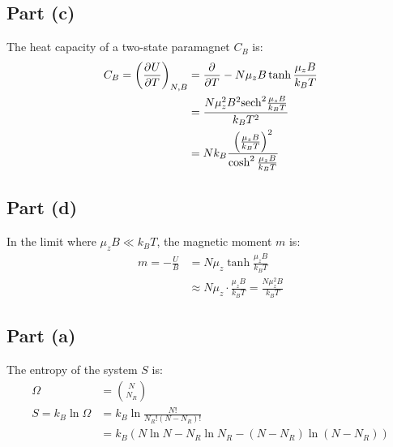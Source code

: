 \documentclass{article}
\begin{document}
\subsection*{Part (c)}
The heat capacity of a two-state paramagnet $C_B$ is:
\begin{equation}
    \begin{split}
        C_B = {\left(\frac{\partial^{}U} {\partial T^{}}\right)}_{N,B} & = \frac{\partial^{}} {\partial T^{}}-N\mu_z B\tanh\frac{\mu_z B}{k_B T} \\
        & = \frac{N{\mu}_z^2B^2\mathrm{sech}^2\frac{\mu_z B}{k_B T}}{k_B T^2} \\
        & = Nk_B\frac{{\left(\frac{\mu_z B}{k_B T}\right)}^2}{\cosh^2\frac{\mu_z B}{k_B T}}
    \end{split}
\end{equation}
\subsection*{Part (d)}
In the limit where $\mu_z B \ll k_B T$, the magnetic moment $m$ is:
\begin{equation}
    \begin{split}
        m = -\frac{U}{B} & = N\mu_z\tanh\frac{\mu_z B}{k_B T} \\
        & \approx N\mu_z \cdot \frac{\mu_z B}{k_B T} = \frac{N\mu_z^2B}{k_B T}
    \end{split}
\end{equation}
\begin{center}
\end{center}

\clearpage

\subsection*{Part (a)}
The entropy of the system $S$ is:
\begin{equation}
    \begin{split}
        \Omega & = {N \choose N_R} \\
        S = k_B\ln\Omega & = k_B\ln\frac{N!}{N_R!\left(N - N_R\right)!} \\
        & = k_B\left(N\ln N - N_R\ln N_R - \left(N - N_R\right)\ln\left(N - N_R\right)\right)
    \end{split}
\end{equation}
\end{document}
